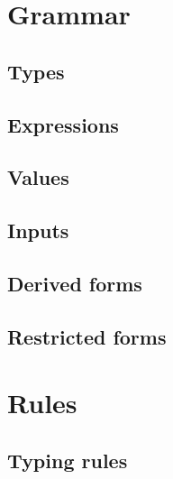 
\section{Grammar}

\subsection{Types}



\subsection{Expressions}



\subsection{Values}



\subsection{Inputs}



\subsection{Derived forms}



\subsection{Restricted forms}



\newpage
\section{Rules}

\subsection{Typing rules}

